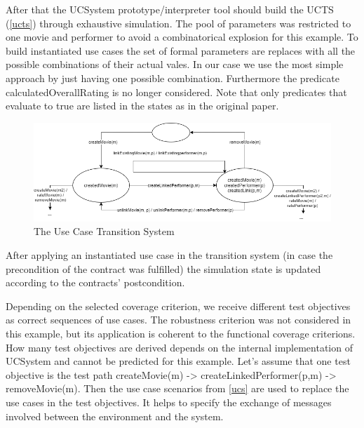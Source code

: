 After that the UCSystem prototype/interpreter tool should build the UCTS (\autoref{ucts}) through exhaustive simulation. The pool of parameters was restricted to one movie and performer to avoid a combinatorical explosion for this example. To build instantiated use cases the set of formal parameters are replaces with all the possible combinations of their actual vales. In our case we use the most simple approach by just having one possible combination. Furthermore the predicate calculatedOverallRating is no longer considered. Note that only predicates that evaluate to true are listed in the states as in the original paper. 

\begin{figure}[h]
	\centering
	\includegraphics[width=1.0\textwidth]{./images/ucts.png}
	\caption{The Use Case Transition System}
	\label{ucts}
\end{figure}

After applying an instantiated use case in the transition system (in case the precondition of the contract was fulfilled) the simulation state is updated according to the contracts' postcondition. 

Depending on the selected coverage criterion, we receive different test objectives as correct sequences of use cases. The robustness criterion was not considered in this example, but its application is coherent to the functional coverage criterions. How many test objectives are derived depends on the internal implementation of UCSystem and cannot be predicted for this example. Let's assume that one test objective is the test path createMovie(m) -> createLinkedPerformer(p,m) -> removeMovie(m). Then the use case scenarios from \autoref{ucs} are used to replace the use cases in the test objectives. It helps to specify the exchange of messages involved between the environment and the system.

\newpage

